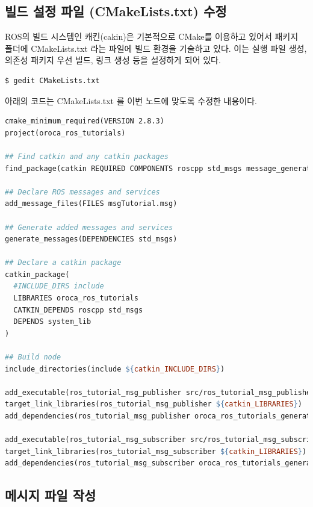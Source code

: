 \subsection{빌드 설정 파일 (CMakeLists.txt) 수정}

ROS의 빌드 시스템인 캐킨(cakin)은 기본적으로 CMake를 이용하고 있어서 패키지 폴더에 CMakeLists.txt 라는 파일에 빌드 환경을 기술하고 있다. 이는 실행 파일 생성, 의존성 패키지 우선 빌드, 링크 생성 등을 설정하게 되어 있다.

\begin{lstlisting}[language=ROS]
$ gedit CMakeLists.txt 
\end{lstlisting}

아래의 코드는 CMakeLists.txt 를 이번 노드에 맞도록 수정한 내용이다.

\begin{lstlisting}[language=make]
cmake_minimum_required(VERSION 2.8.3)
project(oroca_ros_tutorials)

## Find catkin and any catkin packages
find_package(catkin REQUIRED COMPONENTS roscpp std_msgs message_generation)

## Declare ROS messages and services
add_message_files(FILES msgTutorial.msg)

## Generate added messages and services
generate_messages(DEPENDENCIES std_msgs)

## Declare a catkin package
catkin_package(
  #INCLUDE_DIRS include
  LIBRARIES oroca_ros_tutorials
  CATKIN_DEPENDS roscpp std_msgs
  DEPENDS system_lib
)

## Build node
include_directories(include ${catkin_INCLUDE_DIRS})

add_executable(ros_tutorial_msg_publisher src/ros_tutorial_msg_publisher.cpp)
target_link_libraries(ros_tutorial_msg_publisher ${catkin_LIBRARIES})
add_dependencies(ros_tutorial_msg_publisher oroca_ros_tutorials_generate_messages_cpp)

add_executable(ros_tutorial_msg_subscriber src/ros_tutorial_msg_subscriber.cpp)
target_link_libraries(ros_tutorial_msg_subscriber ${catkin_LIBRARIES})
add_dependencies(ros_tutorial_msg_subscriber oroca_ros_tutorials_generate_messages_cpp)
\end{lstlisting}

\subsection{메시지 파일 작성}

